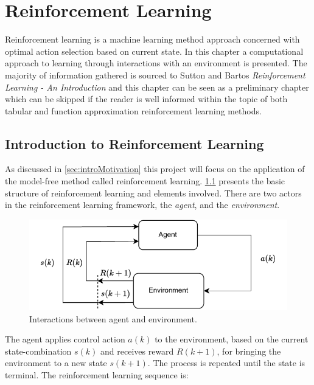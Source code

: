 \chapter{Reinforcement Learning}\label{chap:RL}
Reinforcement learning is a machine learning method approach concerned with  optimal action selection based on current state. 
In this chapter a computational approach to learning through interactions with an environment is presented. The majority of information gathered is sourced to Sutton and Bartos \textit{Reinforcement Learning - An Introduction} \cite{Sutton2020} and this chapter can be seen as a preliminary chapter which can be skipped if the reader is well informed within the topic of both tabular and function approximation reinforcement learning methods.

\newpage

\section{Introduction to Reinforcement Learning}\label{sec:introRL}
As discussed in \cref{sec:introMotivation} this project will focus on the application of the model-free method called reinforcement learning. \cref{fig:Agent-environment} presents the basic structure of reinforcement learning and elements involved. There are two actors in the reinforcement learning framework, the \textit{agent}, and the \textit{environment}. 

\begin{figure}[h!]
	\centering
	\includegraphics[width=1\linewidth]{Figures/AgentEnvironment.pdf}
	\caption{Interactions between agent and environment.}
	\label{fig:Agent-environment}
\end{figure}

The agent applies control action $ a(k) $ to the environment, based on the current state-combination $ s(k) $ and receives reward $ R(k+1) $, for bringing the environment to a new state $ s(k+1) $. The process is repeated until the state is terminal. The reinforcement learning sequence is: 

